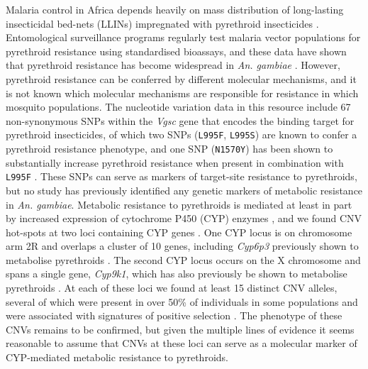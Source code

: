 \documentclass[a4paper,11pt,abstracton,hidelinks]{scrartcl}
\begin{document}
Malaria control in Africa depends heavily on mass distribution of long-lasting insecticidal bed-nets (LLINs) impregnated with pyrethroid insecticides \cite{Ranson2016, Churcher2016, Bhatt2015}.
%
Entomological surveillance programs regularly test malaria vector populations for pyrethroid resistance using standardised bioassays, and these data have shown that pyrethroid resistance has become widespread in \textit{An. gambiae} \cite{Hemingway2016, WHO2018a}.
%
However, pyrethroid resistance can be conferred by different molecular mechanisms, and it is not known which molecular mechanisms are responsible for resistance in which mosquito populations.
%
The nucleotide variation data in this resource include 67 non-synonymous SNPs within the \textit{Vgsc} gene that encodes the binding target for pyrethroid insecticides, of which two SNPs (\texttt{L995F}, \texttt{L995S}) are known to confer a pyrethroid resistance phenotype, and one SNP (\texttt{N1570Y}) has been shown to substantially increase pyrethroid resistance when present in combination with \texttt{L995F} \cite{jones2012}. 
%
These SNPs can serve as markers of target-site resistance to pyrethroids, but no study has previously identified any genetic markers of metabolic resistance in \textit{An. gambiae}.
%
Metabolic resistance to pyrethroids is mediated at least in part by increased expression of cytochrome P450 (CYP) enzymes \cite{kwiatkowska13, edi2014, ngufor15, vontas2018}, and we found CNV hot-spots at two loci containing CYP genes \cite{Lucas2019a}.
%
One CYP locus is on chromosome arm 2R and overlaps a cluster of 10 genes, including \textit{Cyp6p3} previously shown to metabolise pyrethroids \cite{muller2008}.
%
The second CYP locus occurs on the X chromosome and spans a single gene, \textit{Cyp9k1}, which has also previously be shown to metabolise pyrethroids \cite{vontas2018}.
%
At each of these loci we found at least 15 distinct CNV alleles, several of which were present in over 50\% of individuals in some populations and were associated with signatures of positive selection \cite{Lucas2019a}.
%
The phenotype of these CNVs remains to be confirmed, but given the multiple lines of evidence it seems reasonable to assume that CNVs at these loci can serve as a molecular marker of CYP-mediated metabolic resistance to pyrethroids.
\end{document}
